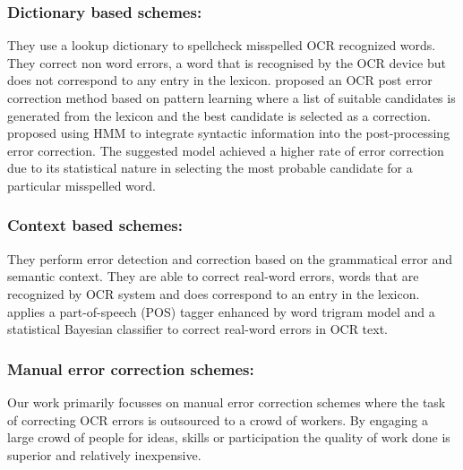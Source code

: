 \documentclass[letterpaper]{article}
\begin{document}
\subsubsection{Dictionary based schemes:}They use a lookup dictionary to spellcheck misspelled OCR recognized words. They correct non word errors, a word that is recognised by the OCR device but does not correspond to any entry in the lexicon. \cite{postprocessing} proposed an OCR post error correction method based on pattern learning where a list of suitable candidates is generated from the lexicon and the best candidate is selected as a correction. \cite{statistical} proposed using HMM to integrate syntactic information into the post-processing error correction. The suggested model achieved a higher rate of error correction due to its statistical nature in selecting the most probable candidate for a particular misspelled word.
\subsubsection{Context based schemes:}They perform error detection and correction based on the grammatical error and semantic context. They are able to correct real-word errors, words that are recognized by OCR system and does correspond to an entry in the lexicon.\cite{contextbased} applies a part-of-speech (POS) tagger enhanced by word trigram model and a statistical Bayesian classifier to correct real-word errors in OCR text.
\subsubsection{Manual error correction schemes:}Our work primarily focusses on manual error correction schemes where the task of correcting OCR errors is outsourced to a crowd of workers. By engaging a large crowd of people for ideas, skills or participation the quality of work done is superior and relatively inexpensive.

\end{document}
